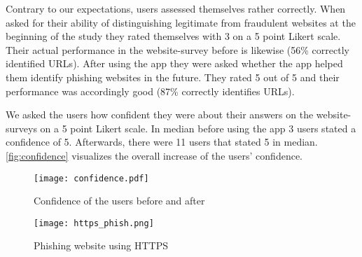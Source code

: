 \begin{description}[leftmargin=0cm]
	\item[User Self-Assessment:] Contrary to our expectations, users assessed themselves rather correctly. When asked for their ability of distinguishing legitimate from fraudulent websites at the beginning of the study they rated themselves with 3 on a 5 point Likert scale.
Their actual performance in the website-survey before is likewise (56\% correctly identified URLs). After using the app they were asked whether the app helped them identify phishing websites in the future. They rated 5 out of 5 and their performance was accordingly good (87\% correctly identifies URLs).
	\item[Confidence:] We asked the users how confident they were about their answers on the website-surveys on a 5 point Likert scale. In median before using the app 3 users stated a confidence of 5. Afterwards, there were 11 users that stated 5 in median. \autoref{fig:confidence} visualizes the overall increase of the users' confidence.
	\begin{figure}
		\centering
		\texttt{[image: confidence.pdf]}
		\caption{Confidence of the users before and after}
		\label{fig:confidence}
		\end{figure}
\end{description}
\begin{figure}
	\centering
	\texttt{[image: https\_phish.png]}
	\caption{Phishing website using HTTPS~\cite{phishtank}}
	\label{fig:https_phish}
	\end{figure}
	
